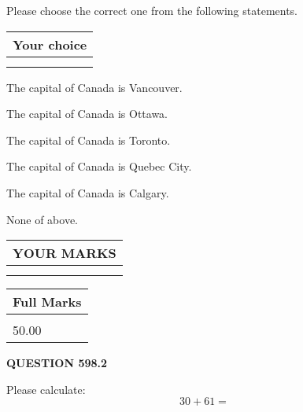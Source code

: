 \documentclass[12pt]{article}
\begin{document}
  
Please choose the correct one from the following statements.
  
  
\noindent\hspace{3.0in} \begin{tabular}{|l|}
\hline
Your choice \\
\hline
 \\ 
 \\ 
\hline
\end{tabular}
  
  
 
 
The capital of Canada is Vancouver.
 
 
The capital of Canada is Ottawa.
 
 
The capital of Canada is Toronto.
 
 
The capital of Canada is Quebec City.
 
 
The capital of Canada is Calgary.
 
 
 None of above.
 
 
  
\vspace{0.2in}
  
\noindent\begin{tabular}{|l|}
\hline
 YOUR MARKS  \\
\hline
 \\ 
 \\ 
\hline
\end{tabular}
\hspace{0.05in} \begin{tabular}{|l|}
\hline
 Full Marks  \\
\hline
 \\ 
50.00 \\
\hline
\end{tabular}
{\textbf{\Large{QUESTION
598.2 
}}}
  
  
 
Please calculate:
\begin{equation}
30 +  %
61 = \nonumber
\end{equation}
 

 

 
   
   
 \vspace{0.2in}
 
   
   
   
   
\end{document}
